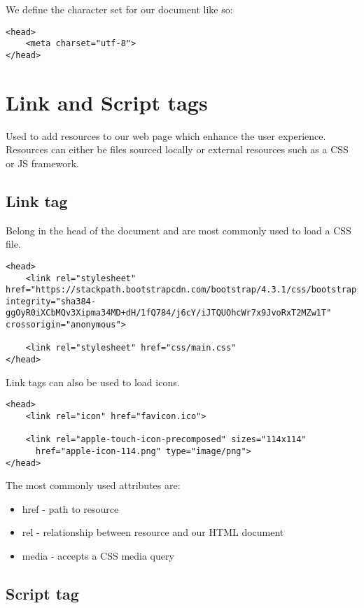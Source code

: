 We define the character set for our document like so:

\begin{verbatim}
<head>
    <meta charset="utf-8">
</head>
\end{verbatim}

\section{Link and Script tags}

Used to add resources to our web page which enhance the user experience. Resources can either be files sourced locally or external resources such as a CSS or JS framework.

\subsection{Link tag}

Belong in the head of the document and are most commonly used to load a CSS file.

\begin{verbatim}
<head>
    <link rel="stylesheet" href="https://stackpath.bootstrapcdn.com/bootstrap/4.3.1/css/bootstrap.min.css" integrity="sha384-ggOyR0iXCbMQv3Xipma34MD+dH/1fQ784/j6cY/iJTQUOhcWr7x9JvoRxT2MZw1T" crossorigin="anonymous">

    <link rel="stylesheet" href="css/main.css"
</head>
\end{verbatim}

Link tags can also be used to load icons.

\begin{verbatim}
<head>
    <link rel="icon" href="favicon.ico">

    <link rel="apple-touch-icon-precomposed" sizes="114x114"
      href="apple-icon-114.png" type="image/png">
</head>
\end{verbatim}

The most commonly used attributes are:

\begin{itemize}[leftmargin=*]
    \item href - path to resource
    \item rel - relationship between resource and our HTML document
    \item media - accepts a CSS media query
\end{itemize}

\subsection{Script tag}

